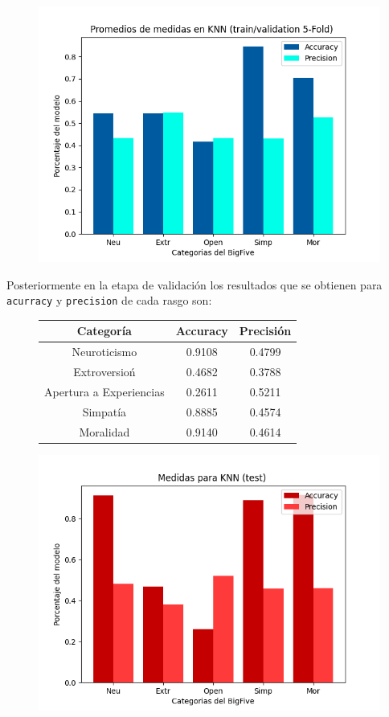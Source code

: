 \documentclass[10pt, a4paper]{article}
\begin{document}
                \begin{figure}[H]
                    \centering
                    \includegraphics[width = 0.7\linewidth]{bar_knn.png}
                \end{figure}

                Posteriormente en la etapa de validaci\'on los resultados que se obtienen para \texttt{acurracy} y \texttt{precision} de cada rasgo son: 

                \begin{figure}[H]
                    \centering
                    \begin{tabular}{|c|c|c|}
                        \hline Categor\'ia & Accuracy & Precisi\'on \\  
                        \hline Neuroticismo             & 0.9108 & 0.4799 \\
                        \hline Extroversio\'n           & 0.4682 & 0.3788 \\
                        \hline Apertura a Experiencias  & 0.2611 & 0.5211 \\
                        \hline Simpat\'ia               & 0.8885 & 0.4574 \\
                        \hline Moralidad                & 0.9140 & 0.4614 \\
                        \hline
                    \end{tabular}
                \end{figure}
            
                \begin{figure}[H]
                    \centering
                    \includegraphics[width = 0.7\linewidth]{bar2_knn.png}
                \end{figure}
\end{document}
